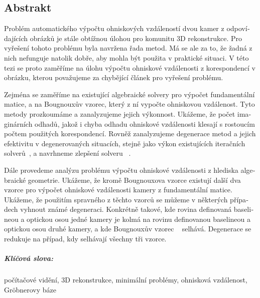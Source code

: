 \begin{otherlanguage}{czech}
\chapter*{Abstrakt}

Problém automatického výpočtu ohniskových vzdáleností dvou kamer z odpovídajících obrázků je stále obtížnou úlohou pro komunitu 3D rekonstrukce. Pro vyřešení tohoto problému byla navržena řada metod. Má se ale za to, že žadná z nich nefunguje natolik dobře, aby mohla být použita v praktické situaci. V této tezi se proto  zaměříme na úlohu výpočtu ohniskové vzdálenosti z korespondencí v obrázku, kterou považujeme za chybějící článek pro vyřešení problému.

Zejména se zaměříme na existující algebraické solvery pro výpočet fundamentální matice, a na Bougnouxův vzorec, který z ní vypočte ohniskovou vzdálenost. Tyto metody prozkoumáme a zanalyzujeme jejich výkonnost. Ukážeme, že počet imaginárních odhadů, jakož i chyba odhadu ohniskové vzdálenosti klesají s rostoucím počtem použitých korespondencí. Rovněž zanalyzujeme degenerace metod a jejich efektivitu v degenerovaných situacích, stejně jako výkon existujících iteračních solverů~\cite{HartleyPriors, Chandraker}, a navrhneme zlepšení solveru {~\cite{HartleyPriors}}.

Dále provedeme analýzu problému výpočtu ohniskové vzdálenosti z hlediska algebraické geometrie. Ukážeme, že kromě Bougnouxova vzorce existují další dva vzorce pro výpočet ohniskové vzdálenosti kamery z fundamentální matice. Ukážeme, že použitím spravného z těchto vzorců se můžeme v některých případech vyhnout známé degeneraci. Konkrétně takové, kde rovina definovaná baselineou a optickou osou jedné kamery je kolmá na rovinu definovanou baselineou a optickou osou druhé kamery, a kde Bougnouxův vzorec ~\cite{Bougnoux} selhává. Degenerace se redukuje na případ, kdy selhávají všechny tři vzorce.

\paragraph{Klíčová slova:} počítačové vidění, 3D rekonstrukce, minimální problémy, ohnisková vzdálenost, Gr\"obnerovy báze
\end{otherlanguage}

\endinput